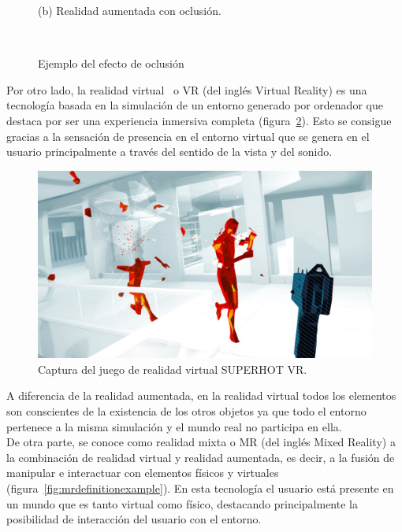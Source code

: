 \begin{figure}[H]
\begin{minipage}{0.5\textwidth}
        (b) Realidad aumentada con oclusión.
    \end{minipage}\\
    \caption{Ejemplo del efecto de oclusión}
    \label{fig:arcoreOclusionExample}
\end{figure}


Por otro lado, la realidad virtual~\cite{vrintroduction} o VR (del inglés Virtual Reality) es una tecnología basada en la simulación de un entorno generado por ordenador que destaca por ser una experiencia inmersiva completa (figura~\ref{fig:superhotVR}). Esto se consigue gracias a la sensación de presencia en el entorno virtual que se genera en el usuario principalmente a través del sentido de la vista y del sonido.

\begin{figure}[H]
    \centering
    \includegraphics[scale=0.25]{Images/Estado del arte/superhotvr.jpg}
    \caption{Captura del juego de realidad virtual SUPERHOT VR.}
    \label{fig:superhotVR}
\end{figure}

A diferencia de la realidad aumentada, en la realidad virtual todos los elementos son conscientes de la existencia de los otros objetos ya que todo el entorno pertenece a la misma simulación y el mundo real no participa en ella.\\



De otra parte, se conoce como realidad mixta o MR (del inglés Mixed Reality) a la combinación de realidad virtual y realidad aumentada, es decir, a la fusión de manipular e interactuar con elementos físicos y virtuales (figura~\ref{fig:mrdefinitionexample}). En esta tecnología el usuario está presente en un mundo que es tanto virtual como físico, destacando principalmente la posibilidad de interacción del usuario con el entorno.\\

